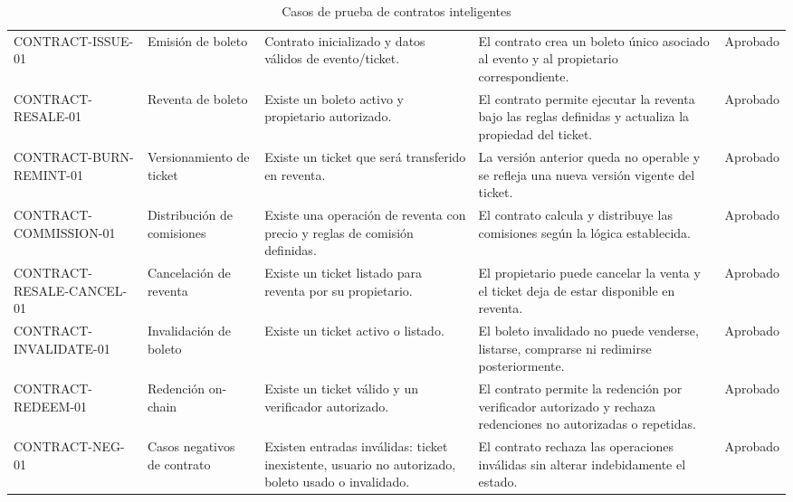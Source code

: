 \documentclass[12pt,letterpaper]{article}
\begin{document}
\begin{table}[H]
\centering
\begingroup
\scriptsize
\setlength{\tabcolsep}{2.5pt}
\renewcommand{\arraystretch}{1.18}

\begin{tabularx}{\textwidth}{|
>{\raggedright\arraybackslash}p{2.5cm}|
>{\raggedright\arraybackslash}p{3.0cm}|
>{\raggedright\arraybackslash}X|
>{\raggedright\arraybackslash}p{3.7cm}|
>{\centering\arraybackslash}p{1.5cm}|}
\hline
\multicolumn{1}{|>{\centering\arraybackslash}m{2.5cm}|}{\textbf{ID}} &
\multicolumn{1}{>{\centering\arraybackslash}m{3.0cm}|}{\textbf{Caso}} &
\multicolumn{1}{>{\centering\arraybackslash}m{3.6cm}|}{\textbf{Precondiciones}} &
\multicolumn{1}{>{\centering\arraybackslash}m{3.7cm}|}{\textbf{Resultado esperado}} &
\multicolumn{1}{>{\centering\arraybackslash}m{1.5cm}|}{\textbf{Estado}} \\
\hline
CONTRACT-ISSUE-01 & Emisión de boleto & Contrato inicializado y datos válidos de evento/ticket. & El contrato crea un boleto único asociado al evento y al propietario correspondiente. & Aprobado \\
\hline
CONTRACT-RESALE-01 & Reventa de boleto & Existe un boleto activo y propietario autorizado. & El contrato permite ejecutar la reventa bajo las reglas definidas y actualiza la propiedad del ticket. & Aprobado \\
\hline
CONTRACT-BURN-REMINT-01 & Versionamiento de ticket & Existe un ticket que será transferido en reventa. & La versión anterior queda no operable y se refleja una nueva versión vigente del ticket. & Aprobado \\
\hline
CONTRACT-COMMISSION-01 & Distribución de comisiones & Existe una operación de reventa con precio y reglas de comisión definidas. & El contrato calcula y distribuye las comisiones según la lógica establecida. & Aprobado \\
\hline
CONTRACT-RESALE-CANCEL-01 & Cancelación de reventa & Existe un ticket listado para reventa por su propietario. & El propietario puede cancelar la venta y el ticket deja de estar disponible en reventa. & Aprobado \\
\hline
CONTRACT-INVALIDATE-01 & Invalidación de boleto & Existe un ticket activo o listado. & El boleto invalidado no puede venderse, listarse, comprarse ni redimirse posteriormente. & Aprobado \\
\hline
CONTRACT-REDEEM-01 & Redención on-chain & Existe un ticket válido y un verificador autorizado. & El contrato permite la redención por verificador autorizado y rechaza redenciones no autorizadas o repetidas. & Aprobado \\
\hline
CONTRACT-NEG-01 & Casos negativos de contrato & Existen entradas inválidas: ticket inexistente, usuario no autorizado, boleto usado o invalidado. & El contrato rechaza las operaciones inválidas sin alterar indebidamente el estado. & Aprobado \\
\hline
\end{tabularx}

\endgroup
\caption{Casos de prueba de contratos inteligentes}
\label{tab:casos-prueba-contratos}
\end{table}
\end{document}
